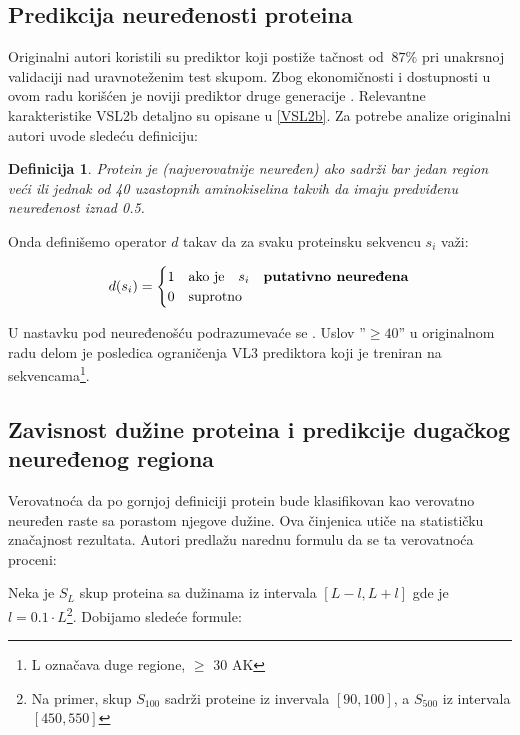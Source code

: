 \subsection{Predikcija neuređenosti proteina}
\label{naredno}

Originalni autori koristili su  prediktor koji
postiže tačnost od $~87\%$ pri unakrsnoj validaciji nad uravnoteženim test
skupom.  Zbog ekonomičnosti i dostupnosti u ovom radu korišćen je noviji
prediktor druge generacije .
Relevantne karakteristike VSL2b detaljno su opisane u \ref{VSL2b}.
Za potrebe analize originalni autori  uvode sledeću definiciju:

\newtheorem{mydef}{Definicija}
\begin{mydef}
\label{pdis_def}
Protein je  (najverovatnije neuređen) 
ako sadrži bar jedan region veći ili jednak od 40 uzastopnih aminokiselina
takvih da imaju \textit{predviđenu neuređenost} iznad 0.5. 
\end{mydef}

Onda definišemo operator $d$ takav da za svaku proteinsku sekvencu $s_i$ važi:

\[   
  d(s_i) = 
    \begin{cases}
      1 & \text{ako je} \quad s_i \quad \textbf{putativno neuređena}\\
      0 & \text{suprotno}
    \end{cases}
\]

U nastavku pod neuređenošću podrazumevaće se .
Uslov ''$\ge40$'' u originalnom radu delom je posledica ograničenja VL3
prediktora koji je treniran na  sekvencama\footnote{L označava
duge regione, $\ge$ 30 AK}.

\subsection{Zavisnost dužine proteina i predikcije dugačkog neuređenog regiona}

Verovatnoća da po gornjoj definiciji protein bude klasifikovan kao verovatno
neuređen raste sa porastom njegove dužine. Ova činjenica  utiče
na statističku značajnost rezultata. Autori \parencite{Xie2007} 
predlažu narednu formulu da se ta verovatnoća proceni:

Neka je $S_L$ skup proteina sa dužinama iz intervala $[L-l, L+l]$ gde je $l
= 0.1 \cdot L$\footnote{Na primer, skup $S_{100}$ sadrži proteine iz invervala $[90, 100]$, a $S_{500}$ iz intervala $[450, 550]$}.
Dobijamo sledeće formule:

